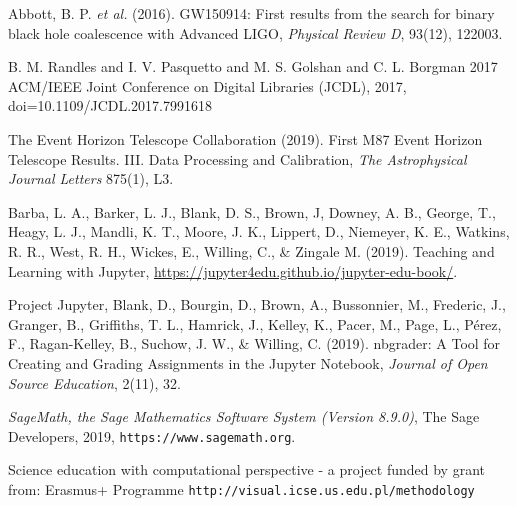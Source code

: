 \documentclass[twocolumn]{svjour3}          %
\begin{document}
\begin{thebibliography}{99}
%
%
Abbott, B. P. \textit{et al.} (2016).
GW150914: First results from the search for binary black hole coalescence with Advanced LIGO,
\textit{Physical Review D}, 93(12), 122003.

B. M. {Randles} and I. V. {Pasquetto} and M. S. {Golshan} and C. L. {Borgman}
2017 ACM/IEEE Joint Conference on Digital Libraries (JCDL),
2017, doi={10.1109/JCDL.2017.7991618}

The Event Horizon Telescope Collaboration (2019).
First M87 Event Horizon Telescope Results. III. Data Processing and Calibration,
\textit{The Astrophysical Journal Letters} 875(1), L3.

Barba, L. A., Barker, L. J., Blank, D. S., Brown, J, Downey, A. B., George, T.,
Heagy, L. J., Mandli, K. T., Moore, J. K., Lippert, D., Niemeyer, K. E.,
Watkins, R. R., West, R. H., Wickes, E., Willing, C., \& Zingale M. (2019).
Teaching and Learning with Jupyter,
\url{https://jupyter4edu.github.io/jupyter-edu-book/}.

Project Jupyter, Blank, D., Bourgin, D., Brown, A., Bussonnier, M.,
Frederic, J., Granger, B., Griffiths, T. L.,  Hamrick, J., Kelley, K.,
Pacer, M., Page, L., P{\'e}rez, F., Ragan-Kelley, B., Suchow, J. W.,
\& Willing, C. (2019).
nbgrader: A Tool for Creating and Grading Assignments in the Jupyter Notebook,
\textit{Journal of Open Source Education}, 2(11), 32.

\newcommand{\etalchar}[1]{$^{#1}$}
\emph{{S}ageMath, the {S}age {M}athematics {S}oftware {S}ystem ({V}ersion
  8.9.0)}, The Sage Developers, 2019, {\tt https://www.sagemath.org}.


  Science education with computational perspective - a project funded by grant from: Erasmus+ Programme 
 \texttt{http://visual.icse.us.edu.pl/methodology}

\end{thebibliography}
\end{document}
